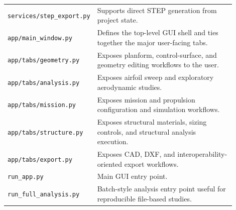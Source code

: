 \documentclass[12pt]{report}
\begin{document}
\begin{longtable}{p{0.28\linewidth} p{0.62\linewidth}}
\texttt{services/step\_export.py} & Supports direct STEP generation from project state. \\
\texttt{app/main\_window.py} & Defines the top-level GUI shell and ties together the major user-facing tabs. \\
\texttt{app/tabs/geometry.py} & Exposes planform, control-surface, and geometry editing workflows to the user. \\
\texttt{app/tabs/analysis.py} & Exposes airfoil sweep and exploratory aerodynamic studies. \\
\texttt{app/tabs/mission.py} & Exposes mission and propulsion configuration and simulation workflows. \\
\texttt{app/tabs/structure.py} & Exposes structural materials, sizing controls, and structural analysis execution. \\
\texttt{app/tabs/export.py} & Exposes CAD, DXF, and interoperability-oriented export workflows. \\
\texttt{run\_app.py} & Main GUI entry point. \\
\texttt{run\_full\_analysis.py} & Batch-style analysis entry point useful for reproducible file-based studies. \\
\end{longtable}
\endgroup
\end{document}

